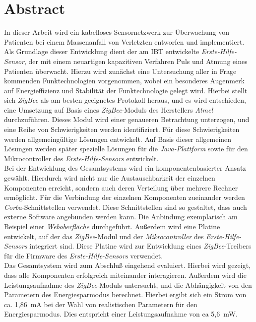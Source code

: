 \chapter*{Abstract}
\begin{small}
In dieser Arbeit wird ein kabelloses Sensornetzwerk zur Überwachung von Patienten bei einem 
Massenanfall von Verletzten entworfen und implementiert. Als Grundlage dieser Entwicklung
dient der am IBT entwickelte \emph{Erste-Hilfe-Sensor}, der mit einem neuartigen kapazitiven
Verfahren Puls und Atmung eines Patienten überwacht.
Hierzu wird zunächst eine Untersuchung aller in Frage kommenden Funktechnologien vorgenommen,
wobei ein besonderes Augenmerk auf Energieffizienz und Stabilität der Funktechnologie gelegt wird.
Hierbei stellt sich \emph{ZigBee} als am besten geeignetes Protokoll heraus, und es wird entschieden,
eine Umsetzung auf Basis eines \emph{ZigBee}-Moduls des Herstellers \emph{Atmel} durchzuführen. 
Dieses Modul wird einer genaueren Betrachtung unterzogen, und eine Reihe von Schwierigkeiten werden
identifiziert. Für diese Schwierigkeiten werden allgemeingültige Lösungen entwickelt. Auf Basis dieser
allgemeinen Lösungen werden später spezielle Lösungen für die \emph{Java-Plattform} sowie für den
Mikrocontroller des \emph{Erste-Hilfe-Sensors} entwickelt.
\\                    
Bei der Entwicklung des Gesamtsystems wird ein komponentenbasierter Ansatz gewählt. Hierdurch wird nicht
nur die Austauschbarkeit der einzelnen Komponenten erreicht, sondern auch deren Verteilung über
mehrere Rechner ermöglicht. Für die Verbindung der einzelnen Komponenten zueinander werden 
\emph{Corba}-Schnittstellen verwendet. Diese Schnittstellen sind so gestaltet, dass auch externe
Software angebunden werden kann. Die Anbindung exemplarisch am Beispiel einer \emph{Weboberfläche} 
durchgeführt.
Außerdem wird eine Platine entwickelt, auf der das \emph{ZigBee}-Modul und der
\emph{Mikrocontroller} des \emph{Erste-Hilfe-Sensors} integriert sind. Diese Platine wird zur 
Entwicklung eines \emph{ZigBee}-Treibers für die Firmware des \emph{Erste-Hilfe-Sensors} verwendet.
\\
Das Gesamtsystem wird zum Abschluß eingehend evaluiert. Hierbei wird gezeigt, dass alle Komponenten
erfolgreich miteinander interagieren. Außerdem wird die Leistungsaufnahme des \emph{ZigBee}-Moduls
untersucht, und die Abhängigkeit von den Parametern des Energiesparmodus berechnet. Hierbei ergibt 
sich ein Strom von ca. 1,86~mA bei der Wahl von realistischen Parametern für den 
Energiesparmodus. Dies entspricht einer Leistungsaufnahme von ca 5,6~mW.

\end{small}

